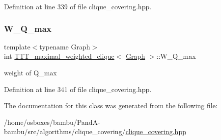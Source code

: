 Definition at line 339 of file clique\+\_\+covering.\+hpp.

\mbox{\label{classTTT__maximal__weighted__clique_a200b7ecc6f47b87e5ad2b838d4b2f1f7}} 
\subsubsection{\texorpdfstring{W\+\_\+\+Q\+\_\+max}{W\_Q\_max}}
{\footnotesize\ttfamily template$<$typename Graph$>$ \\
int \hyperlink{classTTT__maximal__weighted__clique}{T\+T\+T\+\_\+maximal\+\_\+weighted\+\_\+clique}$<$ \hyperlink{structGraph}{Graph} $>$\+::W\+\_\+\+Q\+\_\+max\hspace{0.3cm}{\ttfamily [private]}}



weight of Q\+\_\+max 



Definition at line 341 of file clique\+\_\+covering.\+hpp.



The documentation for this class was generated from the following file\+:\begin{DoxyCompactItemize}
\item 
/home/osboxes/bambu/\+Pand\+A-\/bambu/src/algorithms/clique\+\_\+covering/\hyperlink{clique__covering_8hpp}{clique\+\_\+covering.\+hpp}\end{DoxyCompactItemize}
